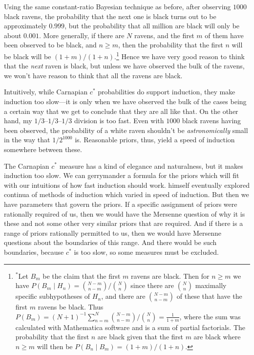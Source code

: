 Using the same constant-ratio Bayesian technique as before, after observing $1000$ black ravens, the probability that the next one is black 
turns out to be approximately $0.999$, but the probability that all million are black will only be about $0.001$. More generally, if there
are $N$ ravens, and the first $m$ of them have been observed to be black, and $n\ge m$, then the probability that the first $n$
will be black will be $(1+m)/(1+n)$.\footnote{$^*$Let $B_m$ be the claim that the first $m$ ravens are black. Then
for $n\ge m$ we have $P(B_m\mid H_n)={N-m \choose n-m}/{N\choose n}$ since there are $N\choose n$ maximally specific subhypotheses of $H_n$, and there are ${N-m\choose n-m}$ of these that have the first $m$ ravens be black. 
Thus $P(B_m)=(N+1)^{-1}\sum_{n=m}^{N} {N-m \choose n-m}/{N\choose n} = \frac{1}{1+m}$, where the sum was
calculated with Mathematica software and is a sum of partial factorials. The probability that the first
$n$ are black given that the first $m$ are black where $n\ge m$ will then be $P(B_n\mid B_m)=(1+m)/(1+n)$.} 
  Hence we have very good reason to think that the \textit{next} raven is black,
but unless we have observed the bulk of the ravens, we won't have reason to think that all the ravens are black. 

Intuitively, while Carnapian $c^*$ probabilities do support induction, they make induction too slow---it is only when we have observed the bulk of the cases
being a certain way that we get to conclude that they are all like that. On the other hand, my $1/3$--$1/3$--$1/3$ division is too fast. Even with
$1000$ black ravens having been observed, the probability of a white raven shouldn't be \textit{astronomically} small in the way
that $1/2^{1000}$ is. Reasonable priors, thus, yield a speed of induction somewhere between these. 

The Carnapian $c^*$ measure has a kind of elegance and naturalness, but it makes induction too slow.
We can gerrymander a formula for the priors which will fit with our intuitions of how fast induction should work.
 himself eventually explored continua of methods of induction which varied in speed of induction.
But then we have parameters that govern the priors. If a specific assignment of priors were rationally
required of us, then we would have the Mersenne question of why it is these and not some other very similar priors that are required. And if there is a range of priors rationally permitted to us, then we would have Mersenne questions about the boundaries of
this range. And there would be such boundaries, because $c^*$ is too slow, so some measures must be excluded.

